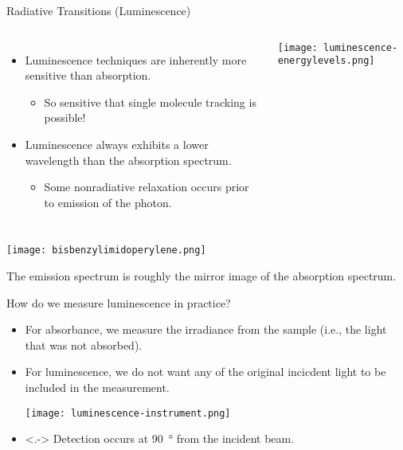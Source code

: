 \documentclass[notes=show]{beamer}
\begin{document}
	\begin{frame}[allowframebreaks]{Radiative Transitions (Luminescence)}
	\begin{columns}
	\begin{itemize}
		\item Luminescence techniques are inherently more sensitive than absorption.
			\begin{itemize}
				\item So sensitive that \alert{single molecule}
					tracking is possible!
			\end{itemize}
		\item Luminescence \alert{always} exhibits a \alert{lower}
			wavelength than the absorption spectrum.
			\begin{itemize}
				\item Some nonradiative relaxation occurs prior
					to emission of the photon.
			\end{itemize}
	\end{itemize}
		\texttt{[image: luminescence-energylevels.png]}
	\end{columns}

	\framebreak

	\begin{center}
		\texttt{[image: bisbenzylimidoperylene.png]}
	\end{center}
	
	The emission spectrum is roughly the mirror image of the absorption
	spectrum.
\end{frame}

\begin{frame}{How do we measure luminescence in practice?}
	\begin{itemize}[<+->]
		\item For absorbance, we measure the irradiance from the sample
			(i.e., the light that was \alert{not} absorbed).
		\item For luminescence, we \alert{do not} want any of the
			original incicdent light to be included in the
			measurement.
			\begin{center}
				\texttt{[image: luminescence-instrument.png]}
			\end{center}
		\item<.-> Detection occurs at \alert{\SI{90}{\degree}} from the
			incident beam.
	\end{itemize}
\end{frame}
\end{document}
